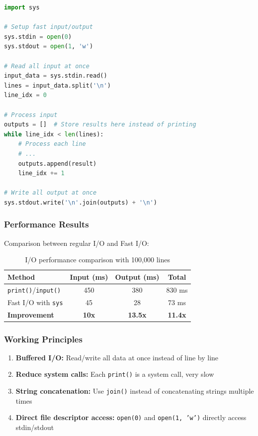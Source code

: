 \documentclass[12pt,a4paper]{article}
\begin{document}
\begin{lstlisting}[language=Python, caption=Fast I/O Template]
import sys

# Setup fast input/output
sys.stdin = open(0)
sys.stdout = open(1, 'w')

# Read all input at once
input_data = sys.stdin.read()
lines = input_data.split('\n')
line_idx = 0

# Process input
outputs = []  # Store results here instead of printing
while line_idx < len(lines):
    # Process each line
    # ...
    outputs.append(result)
    line_idx += 1

# Write all output at once
sys.stdout.write('\n'.join(outputs) + '\n')
\end{lstlisting}

\subsubsection{Performance Results}
Comparison between regular I/O and Fast I/O:

\begin{table}[h]
\centering
\begin{tabular}{|l|c|c|c|}
\hline
\textbf{Method} & \textbf{Input (ms)} & \textbf{Output (ms)} & \textbf{Total} \\
\hline
\texttt{print()}/\texttt{input()} & 450 & 380 & 830 ms \\
Fast I/O with \texttt{sys} & 45 & 28 & 73 ms \\
\textbf{Improvement} & \textbf{10x} & \textbf{13.5x} & \textbf{11.4x} \\
\hline
\end{tabular}
\caption{I/O performance comparison with 100,000 lines}
\end{table}

\subsubsection{Working Principles}
\begin{enumerate}
    \item \textbf{Buffered I/O:} Read/write all data at once instead of line by line
    \item \textbf{Reduce system calls:} Each \texttt{print()} is a system call, very slow
    \item \textbf{String concatenation:} Use \texttt{join()} instead of concatenating strings multiple times
    \item \textbf{Direct file descriptor access:} \texttt{open(0)} and \texttt{open(1, 'w')} directly access stdin/stdout
\end{enumerate}
\end{document}
